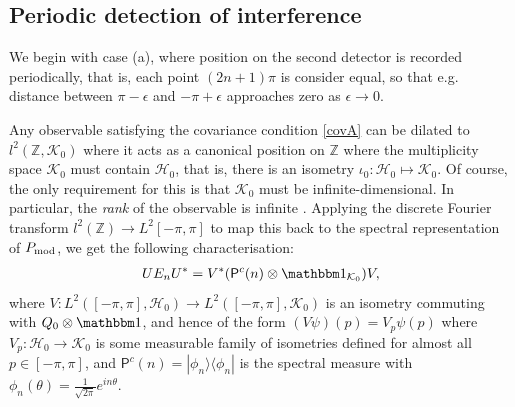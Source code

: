 \subsection{Periodic detection of interference}

We begin with case (a), where position on the second detector is recorded periodically, that is, each point $(2n+1)\pi$ is consider equal, so that e.g. distance between $\pi-\epsilon$ and $-\pi+\epsilon$ approaches zero as $\epsilon\rightarrow 0$.

Any observable satisfying the covariance condition \eqref{covA} can be dilated to $l^2(\mathbb Z, \mathcal K_0)$ where it acts as a canonical position on $\mathbb Z$ \cite{WERNER1990166} where the multiplicity space $\mathcal K_0$ must contain $\mathcal H_0$, that is, there is an isometry $\iota_0:\mathcal H_0\mapsto \mathcal K_0$. Of course, the only requirement for this is that $\mathcal K_0$ must be infinite-dimensional. In particular, the \emph{rank} of the observable is infinite \cite{JP}. Applying the discrete Fourier transform $l^2(\mathbb Z)\to L^2[-\pi,\pi]$ to map this back to the spectral representation of $P_{\mathrm{mod}}$, we get the following characterisation:
\newcommand{\Pc}{\mathsf P^c}
\newcommand{\Qd}{Q_d}
\begin{align}
UE_nU^* = V^* (\Pc(n)\otimes \id_{\mathcal K_0})V,
\end{align}
where $V:L^2([-\pi,\pi],\mathcal H_0)\to L^2([-\pi,\pi],\mathcal K_0)$ is an isometry commuting with $Q_0\otimes \id$, and hence of the form $(V\psi)(p) = V_p\psi(p)$ where $V_p:\mathcal H_0\to \mathcal K_0$ is some measurable family of isometries defined for almost all $p\in [-\pi,\pi]$, and $\Pc(n)=|\phi_n\rangle\langle \phi_n|$ is the spectral measure with $\phi_n(\theta) = \frac {1}{\sqrt{2\pi}} e^{in\theta}$.

